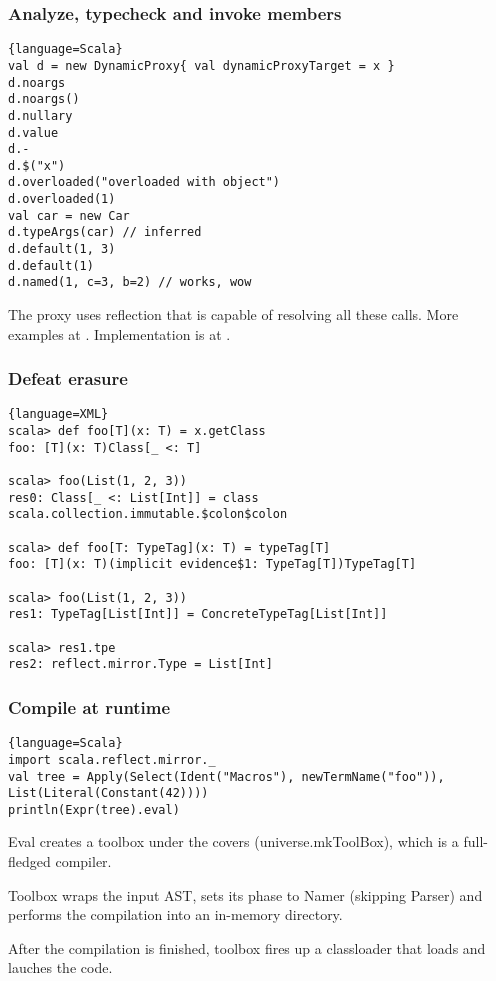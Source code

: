 \documentclass[hyperref={bookmarks=false}]{beamer}
\begin{document}
\begin{frame}[fragile]
\frametitle{Analyze, typecheck and invoke members}

\begin{lstlisting}{language=Scala}
val d = new DynamicProxy{ val dynamicProxyTarget = x }
d.noargs
d.noargs()
d.nullary
d.value
d.-
d.$("x")
d.overloaded("overloaded with object")
d.overloaded(1)
val car = new Car
d.typeArgs(car) // inferred
d.default(1, 3)
d.default(1)
d.named(1, c=3, b=2) // works, wow
\end{lstlisting}

The proxy uses reflection that is capable of resolving all these calls.
More examples at .
Implementation is at .

\end{frame}

\begin{frame}[fragile]
\frametitle{Defeat erasure}

\begin{lstlisting}{language=XML}
scala> def foo[T](x: T) = x.getClass
foo: [T](x: T)Class[_ <: T]

scala> foo(List(1, 2, 3))
res0: Class[_ <: List[Int]] = class scala.collection.immutable.$colon$colon

scala> def foo[T: TypeTag](x: T) = typeTag[T]
foo: [T](x: T)(implicit evidence$1: TypeTag[T])TypeTag[T]

scala> foo(List(1, 2, 3))
res1: TypeTag[List[Int]] = ConcreteTypeTag[List[Int]]

scala> res1.tpe
res2: reflect.mirror.Type = List[Int]
\end{lstlisting}
\end{frame}

\begin{frame}[fragile]
\frametitle{Compile at runtime}

\begin{lstlisting}{language=Scala}
import scala.reflect.mirror._
val tree = Apply(Select(Ident("Macros"), newTermName("foo")), List(Literal(Constant(42))))
println(Expr(tree).eval)
\end{lstlisting}

Eval creates a toolbox under the covers (universe.mkToolBox), which is a full-fledged compiler.

Toolbox wraps the input AST, sets its phase to Namer (skipping Parser) and performs the compilation into an in-memory directory.

After the compilation is finished, toolbox fires up a classloader that loads and lauches the code.

\end{frame}
\end{document}

